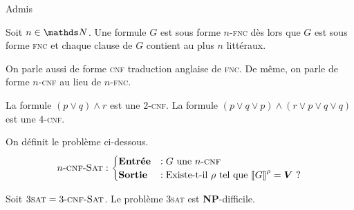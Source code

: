 \begin{prv}
	Admis
\end{prv}

\begin{defn}
	Soit $n \in \N$. Une formule $G$\/ est sous forme $n$-\textsc{fnc} dès lors que $G$\/ est sous forme \textsc{fnc} et chaque clause de $G$\/ contient au plus $n$\/ littéraux.
\end{defn}

On parle aussi de forme \textsc{cnf} traduction anglaise de \textsc{fnc}. De même, on parle de forme $n$-\textsc{cnf} au lieu de $n$-\textsc{fnc}.

\begin{exm}
	La formule $(p \lor q) \land r $\/ est une $2$-\textsc{cnf}.
	La formule $(p \lor q \lor p) \land (r \lor p \lor q \lor q)$\/ est une $4$-\textsc{cnf}.
\end{exm}

\begin{defn}
	On définit le problème ci-dessous. \[
		\text{$n$-\textsc{cnf}-\textsc{Sat}} : \begin{cases}
			\text{\textbf{Entrée}} &: G \text{ une $n$-\textsc{cnf}}\\
			\text{\textbf{Sortie}} &: \text{Existe-t-il $\rho$\/ tel que $\left\llbracket G \right\rrbracket^\rho = \mathbf{V}$\/ ?}
		\end{cases}
	\]
\end{defn}

\begin{prop}
	Soit $\text{3\textsc{sat}} = \text{3-\textsc{cnf}-\textsc{Sat}}$.
	Le problème 3\textsc{sat} est \textbf{NP}-difficile.
\end{prop}
